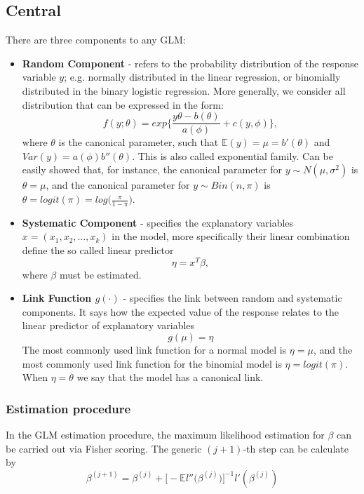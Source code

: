 \documentclass[11pt]{vantage6} %
\begin{document}
\subsection{Central}
There are three components to any GLM:
\begin{itemize}
\item \textbf{Random Component} - refers to the probability distribution of the response variable $y$; e.g. normally distributed in the linear regression, or binomially distributed in the binary logistic regression.  More generally, we consider all distribution that can be expressed in the form:
$$
f(y;\theta)=exp \Bigg\lbrace \frac{y\theta-b(\theta)}{a(\phi)}+c(y,\phi) \Bigg\rbrace,
$$
where $\theta$ is the canonical parameter, such that $\mathbb{E}(y)=\mu=b'(\theta)$ and $Var(y)=a(\phi)b''(\theta)$. This is also called exponential family.
Can be easily showed that, for instance, the canonical parameter for $y \sim N(\mu, \sigma^2)$ is $\theta = \mu$, and the canonical parameter for $y\sim Bin(n, \pi)$ is $\theta = logit(\pi)=log\Big(\frac{\pi}{1-\pi}\Big)$.\\
\item \textbf{Systematic Component} - specifies the explanatory variables $x=(x_1, x_2, \ldots, x_k)$ in the model, more specifically their linear combination define the so called linear predictor
$$\eta=x^T\beta,$$
where $\beta$ must be estimated.
\item \textbf{Link Function $g(\cdot)$} - specifies the link between random and systematic components. It says how the expected value of the response relates to the linear predictor of explanatory variables
$$
g(\mu)=\eta
$$
The most commonly used link function for a normal model is $\eta = \mu$, and the most commonly used link function for the binomial model is $\eta = logit(\pi)$. When $\eta=\theta$ we say that the model has a canonical link.

\end{itemize}

\subsubsection*{Estimation procedure}
In the GLM estimation procedure, the maximum likelihood estimation for $\beta$ can be carried out via Fisher scoring. The generic $(j+1)$-th step can be calculate by
\begin{equation}
\beta^{(j+1)}=\beta^{(j)}+ \Big[ -\mathbb{E}l''\big( \beta^{(j)} \big) \Big]^{-1} l'(\beta^{(j)})
\end{equation}\label{step}
\end{document}
